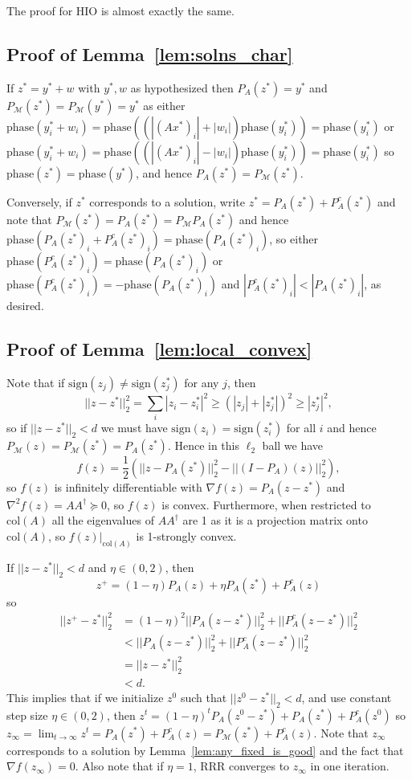 \documentclass[journal]{IEEEtran}
\theoremstyle{definition}
\theoremstyle{remark}
\theoremstyle{definition}
\theoremstyle{problem}
\theoremstyle{definition}
\newcommand{\col}{\text{col}}
\newcommand{\sign}{\text{sign}}
\newcommand{\phase}{\text{phase}}
\newcommand{\MM}{\mathcal{M}}
\begin{document}
The proof for HIO is almost exactly the same.

\subsection{Proof of Lemma~\ref{lem:solns_char}}\label{sec:pf_solns_char}

If $z^* = y^*+w$ with $y^*,w$ as hypothesized then $P_A(z^*)=y^*$ and $P_{\MM}(z^*) = P_{\MM}(y^*)=y^*$ as either $\phase(y^*_i+w_i) = \phase((|(Ax^*)_i|+|w_i|)\phase(y^*_i))=\phase(y^*_i)$ or $\phase(y^*_i+w_i) = \phase((|(Ax^*)_i|-|w_i|)\phase(y^*_i))=\phase(y^*_i)$ so $\phase(z^*)=\phase(y^*)$, and hence $P_A(z^*)=P_{\MM}(z^*)$.

Conversely, if $z^*$ corresponds to a solution, write $z^* = P_A(z^*) + P_A^c(z^*)$ and note that $P_{\MM}(z^*) = P_A(z^*) = P_{\MM}P_A(z^*)$ and hence $\phase(P_A(z^*)_i + P_A^c(z^*)_i) = \phase(P_A(z^*)_i)$, so either $\phase(P_A^c(z^*)_i)=\phase(P_A(z^*)_i)$ or $\phase(P_A^c(z^*)_i)=-\phase(P_A(z^*)_i)$ and $|P_A^c(z^*)_i|<|P_A(z^*)_i|$, as desired.

\subsection{Proof of Lemma~\ref{lem:local_convex}}\label{sec:pf_local_convex}

Note that if $\sign(z_j)\neq \sign(z^*_j)$ for any $j$, then
\[ ||z-z^*||_2^2 = \sum_i|z_i-z^*_i|^2 \geq (|z_j| + |z^*_j|)^2 \geq |z^*_j|^2,\]
so if $||z-z^*||_2<d$ we must have $\sign(z_i)=\sign(z^*_i)$ for all $i$ and hence $P_{\MM}(z)=P_{\MM}(z^*)=P_A(z^*)$. Hence in this $\ell_2$ ball we have
\[ f(z) = \frac{1}{2}\left(||z-P_A(z^*)||_2^2 - ||(I-P_A)(z)||_2^2\right),\]
so $f(z)$ is infinitely differentiable with $\nabla f(z) = P_A(z-z^*)$ and $\nabla^2 f(z) = AA^{\dagger}\succeq 0$, so $f(z)$ is convex. Furthermore, when restricted to $\col(A)$ all the eigenvalues of $AA^{\dagger}$ are 1 as it is a projection matrix onto $\col(A)$, so $f(z)|_{\col(A)}$ is 1-strongly convex.

If $||z-z^*||_2<d$ and $\eta\in(0,2)$, then $$z^+ = (1-\eta)P_A(z) + \eta P_A(z^*) + P_A^c(z)$$ so
\[\begin{aligned} ||z^+-z^*||_2^2 &= (1-\eta)^2||P_A(z-z^*)||_2^2 + ||P_A^c(z-z^*)||_2^2\\
&< ||P_A(z-z^*)||_2^2 + ||P_A^c(z-z^*)||_2^2\\
&= ||z-z^*||_2^2 \\& < d.\end{aligned}\]
This implies that if we initialize $z^0$ such that $||z^0-z^*||_2<d$, and use constant step size $\eta\in(0,2)$, then $z^t = (1-\eta)^tP_A(z^0-z^*) + P_A(z^*) + P_A^c(z^0)$ so $z_{\infty}=\lim_{t\to\infty}z^t = P_A(z^*) + P_A^c(z) = P_{\MM}(z^*) + P_A^c(z)$. Note that $z_{\infty}$ corresponds to a solution by Lemma~\ref{lem:any_fixed_is_good} and the fact that $\nabla f(z_{\infty}) = 0$. Also note that if $\eta = 1$, RRR converges to $z_{\infty}$ in one iteration.
\end{document}
